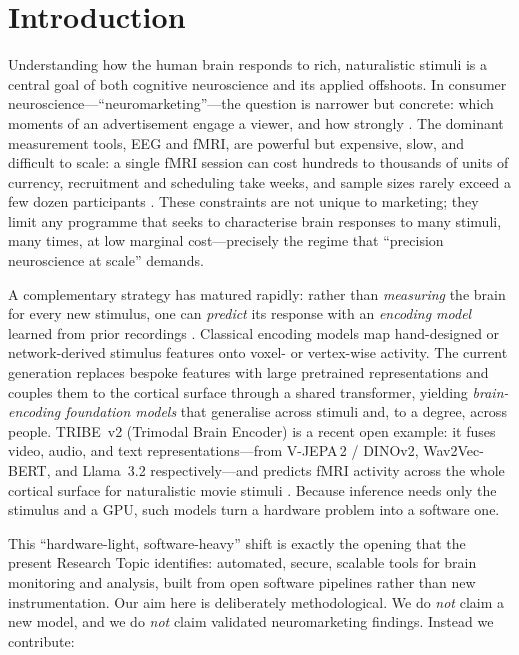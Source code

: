 \documentclass[11pt]{article}
\begin{document}
\section{Introduction}

Understanding how the human brain responds to rich, naturalistic stimuli is a
central goal of both cognitive neuroscience and its applied offshoots. In
consumer neuroscience---``neuromarketing''---the question is narrower but
concrete: which moments of an advertisement engage a viewer, and how strongly
\citep{ariely2010,plassmann2015}. The dominant measurement tools, EEG and fMRI,
are powerful but expensive, slow, and difficult to scale: a single fMRI session
can cost hundreds to thousands of units of currency, recruitment and scheduling
take weeks, and sample sizes rarely exceed a few dozen participants
\citep{poldrack2017}. These constraints are not unique to marketing; they limit
any programme that seeks to characterise brain responses to many stimuli, many
times, at low marginal cost---precisely the regime that ``precision
neuroscience at scale'' demands.

A complementary strategy has matured rapidly: rather than \emph{measuring} the
brain for every new stimulus, one can \emph{predict} its response with an
\emph{encoding model} learned from prior recordings
\citep{naselaris2011,huth2016}. Classical encoding models map hand-designed or
network-derived stimulus features onto voxel- or vertex-wise activity. The
current generation replaces bespoke features with large pretrained
representations and couples them to the cortical surface through a shared
transformer, yielding \emph{brain-encoding foundation models} that generalise
across stimuli and, to a degree, across people. TRIBE~v2 (Trimodal Brain
Encoder) is a recent open example: it fuses video, audio, and text
representations---from V-JEPA\,2 / DINOv2, Wav2Vec-BERT, and Llama~3.2
respectively---and predicts fMRI activity across the whole cortical surface for
naturalistic movie stimuli \citep{tribe2025,vjepa2,dinov2,wav2vecbert,llama3}.
Because inference needs only the stimulus and a GPU, such models turn a
hardware problem into a software one.

This ``hardware-light, software-heavy'' shift is exactly the opening that the
present Research Topic identifies: automated, secure, scalable tools for brain
monitoring and analysis, built from open software pipelines rather than new
instrumentation. Our aim here is deliberately methodological. We do \emph{not}
claim a new model, and we do \emph{not} claim validated neuromarketing findings.
Instead we contribute:
\end{document}
